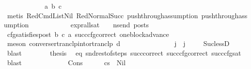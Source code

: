 \begin{isabellebody}
\ \ \ \ \ \ \ \ \ \ \ \ a\ b\ c\isanewline
\ \ \ \ \ \ \ \ \ \ \isamarkupfalse%
\ {\isacharparenleft}{\kern0pt}metis\ RedCmdListNil\ RedNormalSucc\ push{\isacharunderscore}{\kern0pt}through{\isacharunderscore}{\kern0pt}assumption{}\ push{\isacharunderscore}{\kern0pt}through{\isacharunderscore}{\kern0pt}assumption{}{\isacharparenright}{\kern0pt}\ \ \isanewline
\ \ \ \ \ \ \ \ \isamarkupfalse%
\ {\isachardoublequoteopen}{\isacharparenleft}{\kern0pt}expr{\isacharunderscore}{\kern0pt}all{\isacharunderscore}{\kern0pt}sat\ {\isasymLambda}\ {\isasymGamma}\ {\isasymOmega}\ ns{\isacharunderscore}{\kern0pt}end{\isacharparenright}{\kern0pt}\ posts{\isachardoublequoteclose}\ \isamarkupfalse%
\ cfg{\isacharunderscore}{\kern0pt}satisfies{\isacharunderscore}{\kern0pt}post\ b\ c\ a\ succ{\isacharunderscore}{\kern0pt}cfg{\isacharunderscore}{\kern0pt}correct\ one{\isacharunderscore}{\kern0pt}block{\isacharunderscore}{\kern0pt}advance\ \isanewline
\ \ \ \ \ \ \ \ \ \ \isamarkupfalse%
\ {\isacharparenleft}{\kern0pt}meson\ converse{\isacharunderscore}{\kern0pt}rtranclp{\isacharunderscore}{\kern0pt}into{\isacharunderscore}{\kern0pt}rtranclp\ d{\isacharparenright}{\kern0pt}\ \isanewline
\ \ \ \ \ \ \isamarkupfalse%
\isanewline
\isanewline
\ \ \ \ \ \ \isamarkupfalse%
\ {\isachardoublequoteopen}j{\isacharprime}{\kern0pt}\ {\isacharless}{\kern0pt}\ j{\isachardoublequoteclose}\ \isamarkupfalse%
\ {}\ \isamarkupfalse%
\ Suc{\isacharunderscore}{\kern0pt}lessD\ \isamarkupfalse%
\ blast\isanewline
\isanewline
\ \ \ \ \ \ \isamarkupfalse%
\ {\isacharquery}{\kern0pt}thesis\ \isamarkupfalse%
\ eq\ snd{\isacharunderscore}{\kern0pt}rest{\isacharunderscore}{\kern0pt}of{\isacharunderscore}{\kern0pt}steps\ succ{\isacharunderscore}{\kern0pt}correct\ succ{\isacharunderscore}{\kern0pt}cfg{\isacharunderscore}{\kern0pt}correct\ succ{\isacharunderscore}{\kern0pt}cfg{\isacharunderscore}{\kern0pt}sat\ \isamarkupfalse%
\ blast\isanewline
\ \ \ \ \isamarkupfalse%
\isanewline
\ \ \isamarkupfalse%
\isanewline
\ \ \ \ \isamarkupfalse%
\ {\isacharparenleft}{\kern0pt}Cons{\isacharparenright}{\kern0pt}\isanewline
\ \ \ \ \isamarkupfalse%
\ {\isachardoublequoteopen}cs{}\ {\isasymnoteq}\ Nil{\isachardoublequoteclose}\ \isamarkupfalse%

\end{isabellebody}
